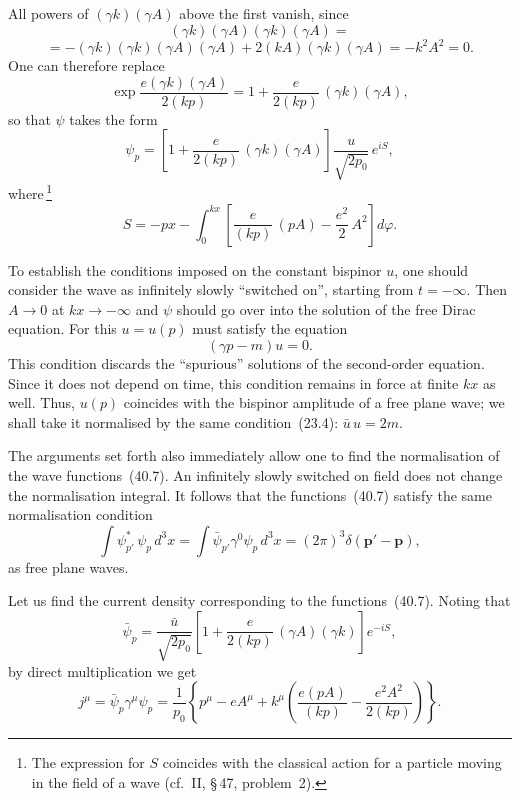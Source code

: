 All powers of $(\gamma k)(\gamma A)$ above the first vanish, since
\[
(\gamma k)(\gamma A)(\gamma k)(\gamma A) =
\]
\[
= -(\gamma k)(\gamma k)(\gamma A)(\gamma A) + 2(kA)(\gamma k)(\gamma A) = -k^2A^2 = 0.
\]
One can therefore replace
\[
\exp\frac{e(\gamma k)(\gamma A)}{2(kp)} = 1 + \frac{e}{2(kp)}\,(\gamma k)(\gamma A),
\]
so that $\psi$ takes the form
\begin{equation}
\psi_p = \left[1 + \frac{e}{2(kp)}\,(\gamma k)(\gamma A)\right]\frac{u}{\sqrt{2p_0}}\,e^{iS},
\tag{40.7}
\end{equation}
where\,\footnote{The expression for $S$ coincides with the classical action for a particle moving in the field of a wave (cf.~II, \S\,47, problem~2).}
\begin{equation}
S = -px - \int_0^{kx}\!\left[\frac{e}{(kp)}\,(pA) - \frac{e^2}{2}\,A^2\right]\!d\varphi.
\tag{40.8}
\end{equation}

To establish the conditions imposed on the constant bispinor $u$, one should consider the wave as infinitely slowly ``switched on'', starting from $t = -\infty$. Then $A\to 0$ at $kx\to-\infty$ and $\psi$ should go over into the solution of the free Dirac equation. For this $u = u(p)$ must satisfy the equation
\begin{equation}
(\gamma p - m)u = 0.
\tag{40.9}
\end{equation}
This condition discards the ``spurious'' solutions of the second-order equation. Since it does not depend on time, this condition remains in force at finite $kx$ as well. Thus, $u(p)$ coincides with the bispinor amplitude of a free plane wave; we shall take it normalised by the same condition~(23.4): $\bar u\,u = 2m$.

The arguments set forth also immediately allow one to find the normalisation of the wave functions~(40.7). An infinitely slowly switched on field does not change the normalisation integral. It follows that the functions~(40.7) satisfy the same normalisation condition
\begin{equation}
\int\psi^*_{p'}\,\psi_p\,d^3x = \int\bar\psi_{p'}\gamma^0\psi_p\,d^3x = (2\pi)^3\delta(\mathbf{p}' - \mathbf{p}),
\tag{40.10}
\end{equation}
as free plane waves.

Let us find the current density corresponding to the functions~(40.7). Noting that
\[
\bar\psi_p = \frac{\bar u}{\sqrt{2p_0}}\!\left[1 + \frac{e}{2(kp)}\,(\gamma A)(\gamma k)\right]e^{-iS},
\]
by direct multiplication we get
\begin{equation}
j^\mu = \bar\psi_p\gamma^\mu\psi_p = \frac{1}{p_0}\!\left\{p^\mu - eA^\mu + k^\mu\!\left(\frac{e(pA)}{(kp)} - \frac{e^2A^2}{2(kp)}\right)\right\}.
\tag{40.11}
\end{equation}

